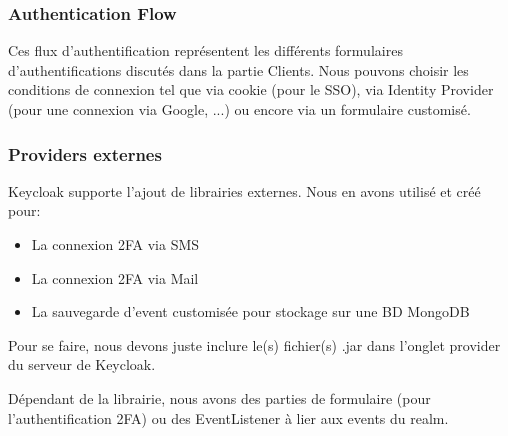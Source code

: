 \subsubsection{Authentication Flow}

Ces flux d'authentification représentent les différents formulaires d'authentifications discutés dans la
partie Clients. Nous pouvons choisir les conditions de connexion tel que via cookie (pour le SSO), via
Identity Provider (pour une connexion via Google, ...) ou encore via un formulaire customisé.

\subsubsection{Providers externes}

Keycloak supporte l'ajout de librairies externes. Nous en avons utilisé et créé pour:

\begin{itemize}
    \item La connexion 2FA via SMS
    \item La connexion 2FA via Mail
    \item La sauvegarde d'event customisée pour stockage sur une BD MongoDB
\end{itemize}

Pour se faire, nous devons juste inclure le(s) fichier(s) .jar dans l'onglet provider du serveur de
Keycloak.

Dépendant de la librairie, nous avons des parties de formulaire (pour l'authentification 2FA) ou des
EventListener à lier aux events du realm.

